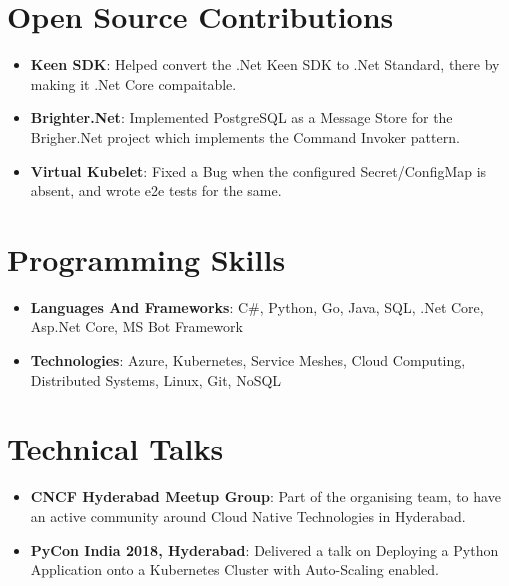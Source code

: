 \documentclass[letterpaper,11pt]{article}
\newcommand{\resumeItem}[2]{
  \item\small{
    \textbf{#1}{: #2 \vspace{-2pt}}
  }
}
\newcommand{\resumeSubItem}[2]{\resumeItem{#1}{#2}\vspace{-4pt}}
\newcommand{\resumeSubHeadingListStart}{\begin{itemize}[leftmargin=*]}
\newcommand{\resumeSubHeadingListEnd}{\end{itemize}}
\begin{document}
\section{Open Source Contributions}
  \resumeSubHeadingListStart
    \resumeSubItem{Keen SDK}
      {Helped convert the .Net Keen SDK to .Net Standard, there by making it .Net Core compaitable.}
    \resumeSubItem{Brighter.Net}
     {Implemented PostgreSQL as a Message Store for the Brigher.Net project which implements the Command Invoker pattern.}
     \resumeSubItem{Virtual Kubelet}
     {Fixed a Bug when the configured Secret/ConfigMap is absent, and wrote e2e tests for the same.}
    \resumeSubHeadingListEnd

    \section{Programming Skills}
      \resumeSubHeadingListStart
        \resumeSubItem{Languages And Frameworks}{C\#, Python, Go, Java, SQL, .Net Core, Asp.Net Core, MS Bot Framework }
        \resumeSubItem{Technologies}{Azure, Kubernetes, Service Meshes, Cloud Computing, Distributed Systems, Linux, Git, NoSQL}
        \resumeSubHeadingListEnd

\section{Technical Talks}
  \resumeSubHeadingListStart
  \resumeSubItem{CNCF Hyderabad Meetup Group}{ Part of the organising team, to have an active community around Cloud Native Technologies in Hyderabad. }
    \resumeSubItem{PyCon India 2018, Hyderabad}{Delivered a talk on Deploying a Python Application onto a Kubernetes Cluster with Auto-Scaling enabled. }
  \resumeSubHeadingListEnd



\end{document}
